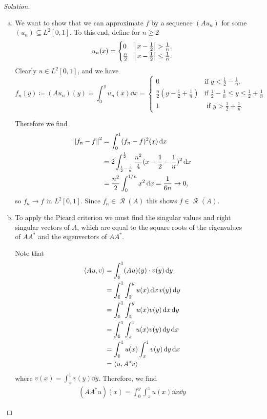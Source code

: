 \documentclass{article}
\theoremstyle{plain}
\theoremstyle{remark}
\newenvironment{solution}{\begin{proof}[Solution]\renewcommand\qedsymbol{}}{\end{proof}}
\newcommand{\Bb}{\mathbb}
\newcommand{\Cal}{\mathcal}
\newcommand{\NN}{\Bb N}
\DeclarePairedDelimiter{\ang}{\langle}{\rangle}
\newcommand\ceq\coloneqq %
\newcommand\clos\overline
\DeclareMathOperator\Ran{\Cal R}
\begin{document}
\begin{solution}
	\begin{enumerate}[(a)]
		\item We want to show that we can approximate $f$ by a sequence $(Au_n)$ for some $(u_n) \subseteq L^2[0,1]$. To this end, define for $n \geq 2$
		\[
		u_n(x) =
		\begin{cases}
			0 &\abs{x - \frac12} > \frac1n, \\
			\frac n2 &\abs{x - \frac12} \leq \frac1n. 
		\end{cases}
		\]
		Clearly $u \in L^2[0, 1]$, and we have
		\[
		f_n(y) \ceq (Au_n)(y) = \int_0^y u_n(x) \dd{x} = \begin{cases}
			0 &\text{if $y < \frac12 - \frac1n$,}\\
			\frac n2(y - \frac12 + \frac1n) &\text{if $\frac12 - \frac1n \leq y \leq \frac12 + \frac1n$} \\
			1 &\text{ if $y > \frac12 + \frac1n$}. 
		\end{cases}
		\]
		
		Therefore we find
		\begin{align*}
			\norm{f_n - f}^2 &= \int_0^1 (f_n - f)^2(x) \dd{x} \\
			&= 2 \int_{\frac12 - \frac1n}^{\frac12} \frac{n^2}{4} (x - \frac12 - \frac1n)^2 \dd{x} \\
			&= \frac{n^2}{2} \int_0^{1/n}  x^2 \dd{x} = \frac{1}{6n} \to 0, 
		\end{align*}
	so $f_n \to f$ in $L^2[0, 1]$. Since $f_n \in \Ran(A)$ this shows $f \in \clos{\Ran(A)}$. 
	
	\item To apply the Picard criterion we must find the singular values and right singular vectors of $A$, which are equal to the square roots of the eigenvalues of $AA^*$ and the eigenvectors of $AA^*$. 
	
	Note that 
	\begin{align*}
		\ang{Au, v} &= \int_0^1 (Au)(y)\cdot v(y) \dd{y} \\
		&= \int_0^1 \int_0^y u(x) \dd{x} v(y) \dd{y} \\
		&= \int_0^1 \int_0^y u(x) v(y) \dd{x} \dd{y} \\
		&= \int_0^1 \int_x^1 u(x) v(y) \dd{y} \dd{x} \\ 
		&= \int_0^1 u(x) \int_x^1 v(y) \dd{y} \dd{x} \\
		&= \ang{u, A^* v}
	\end{align*}
where $v(x) = \int_x^1 v(y) \dd{y}$.  Therefore, we find
\begin{align*}
	(AA^* u)(x) = \int_0^y \int_x^1 u(x) \dd{x} \dd{y}
\end{align*}
	\end{enumerate}
\end{solution}
\end{document}
